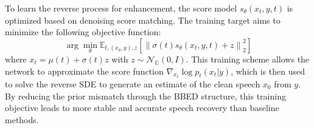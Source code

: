 \documentclass[cameraready]{Interspeech}
\begin{document}
To learn the reverse process for enhancement, the score model $s_{\theta}(x_t, y, t)$ is optimized based on denoising score matching. The training target aims to minimize the following objective function:
\begin{equation}
    \arg \min_{\theta} \mathbb{E}_{t, (x_0, y), z} \left[ \left\lVert \sigma(t) s_{\theta}(x_t, y, t) + z \right\rVert_2^2 \right]
\end{equation}
where $x_t = \mu(t) + \sigma(t)z$ with $z \sim \mathcal{N}_{\mathbb{C}}(0, I)$. This training scheme allows the network to approximate the score function $\nabla_{x_t} \log p_t(x_t | y)$, which is then used to solve the reverse SDE to generate an estimate of the clean speech $x_0$ from $y$. By reducing the prior mismatch through the BBED structure, this training objective leads to more stable and accurate speech recovery than baseline methods.
\end{document}
